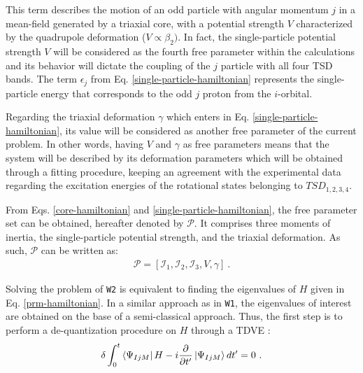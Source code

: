 \documentclass[11pt]{article}
\begin{document}
This term describes the motion of an odd particle with angular momentum $j$ in a mean-field generated by a triaxial core, with a potential strength $V$ characterized by the quadrupole deformation ($V\propto\beta_2)$. In fact, the single-particle potential strength $V$ will be considered as the fourth free parameter within the calculations and its behavior will dictate the coupling of the $j$ particle with all four TSD bands. The term $\epsilon_j$ from Eq. \ref{single-particle-hamiltonian} represents the single-particle energy that corresponds to the odd $j$ proton from the $i$-orbital.

Regarding the triaxial deformation $\gamma$ which enters in Eq. \ref{single-particle-hamiltonian}, its value will be considered as another free parameter of the current problem. In other words, having $V$ and $\gamma$ as free parameters means that the system will be described by its deformation parameters which will be obtained through a fitting procedure, keeping an agreement with the experimental data regarding the excitation energies of the rotational states belonging to $TSD_{1,2,3,4}$.

From Eqs. \ref{core-hamiltonian} and \ref{single-particle-hamiltonian}, the free parameter set can be obtained, hereafter denoted by $\mathcal{P}$. It comprises three moments of inertia, the single-particle potential strength, and the triaxial deformation. As such, $\mathcal{P}$ can be written as:
\begin{align}
    \mathcal{P}=\left[\mathcal{I}_1,\mathcal{I}_2,\mathcal{I}_3,V,\gamma\right]\ .
    \label{parameter-set}
\end{align}

Solving the problem of \texttt{W2} is equivalent to finding the eigenvalues of $H$ given in Eq. \ref{prm-hamiltonian}. In a similar approach as in \texttt{W1}, the eigenvalues of interest are obtained on the base of a semi-classical approach. Thus, the first step is to perform a de-quantization procedure on $H$ through a TDVE \cite{raduta2007semiclassical,budaca2018tilted,raduta2017semiclassical}:
\begin{align}
    \delta\int_0^t\bra{\Psi_{IjM}}H-i\frac{\partial}{\partial t'}\ket{\Psi_{IjM}}dt'=0\ .
    \label{tdve}
\end{align}
\end{document}
